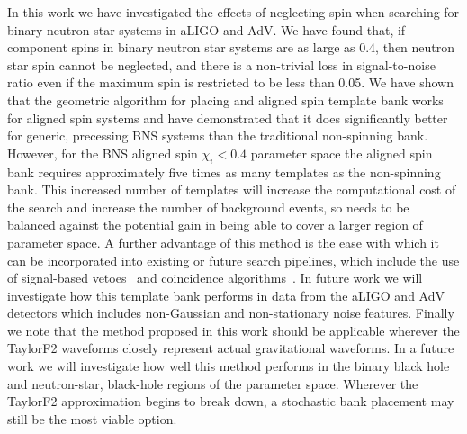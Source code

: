 In this work we have investigated the effects of neglecting spin when
searching for binary neutron star systems in aLIGO and AdV. We have found
that, if component spins in binary neutron star systems are as large as 0.4,
then neutron star spin cannot be neglected, and there is a non-trivial loss in
signal-to-noise ratio even if the maximum spin is restricted to be less than
0.05. We have shown that the
geometric algorithm for placing and aligned spin template bank works for
aligned spin systems and have demonstrated that it does significantly better
for generic, precessing BNS systems than the traditional non-spinning bank.
However, for the BNS aligned spin $\chi_i < 0.4$ parameter space the aligned
spin bank requires approximately five times as many templates as the
non-spinning bank. This increased number of templates will increase the
computational cost of the search and increase the number of background events,
so needs to be balanced against the potential gain in being able to cover a
larger region of parameter space. A further advantage of this method is the ease
with which it can be incorporated into existing or future search
pipelines, which include the use of signal-based vetoes~\cite{Allen:2004gu}
and coincidence algorithms~\cite{Robinson:2008}. In future work we will
investigate how this template bank performs in data from the aLIGO and AdV
detectors which includes non-Gaussian and non-stationary noise features.
Finally we note that the method proposed in this work should be applicable
wherever the TaylorF2 waveforms closely represent actual gravitational
waveforms. In a future work we will investigate how well this method performs
in the binary black hole and neutron-star, black-hole regions of the parameter space.
Wherever the TaylorF2 approximation begins to break down, a stochastic
bank placement may still be the most viable option.


